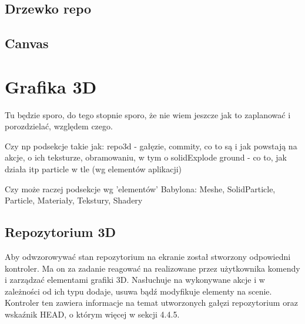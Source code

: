 \documentclass[12pt,a4paper,polish,thesis]{dcsbook}
\begin{document}
{	\subsection{Drzewko repo}

	

	\subsection{Canvas}

	

	\section{Grafika 3D}
	Tu będzie sporo, do tego stopnie sporo, że nie wiem jeszcze jak to zaplanować i porozdzielać, względem czego.

	Czy np podsekcje takie jak:
	repo3d - gałęzie, commity, co to są i jak powstają na akcje, o ich teksturze, obramowaniu, w tym o solidExplode
	ground - co to, jak działa itp
	particle w tle
	(wg elementów aplikacji)

	Czy może raczej podsekcje wg 'elementów' Babylona:
	Meshe, SolidParticle, Particle, Materiały, Tekstury, Shadery



	\subsection{Repozytorium 3D}
		Aby odwzorowywać stan repozytorium na ekranie został stworzony odpowiedni kontroler. Ma on za zadanie reagować na realizowane przez użytkownika komendy i zarządzać elementami grafiki 3D. Nasłuchuje na wykonywane akcje i w zależności od ich typu dodaje, usuwa bądź modyfikuje elementy na scenie. Kontroler ten zawiera informacje na temat utworzonych gałęzi repozytorium oraz wskaźnik HEAD, o którym więcej w sekcji 4.4.5.

}
\end{document}
